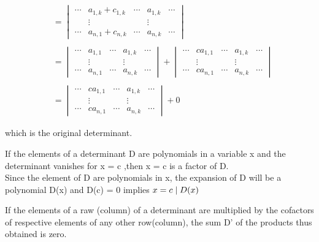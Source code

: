 \documentclass{article}
\begin{document}
\begin{align*}
 &=\begin{vmatrix}
\cdots&a_{1,k}+c_{1,k}&\cdots&a_{1,k}& \cdots      \\
&\vdots & &\vdots \\ 
\cdots&a_{n,1}+c_{n,k}  & \cdots & a_{n,k} & \cdots
\end{vmatrix} \\ \\
&= \begin{vmatrix}
\cdots&a_{1,1}      &\cdots& a_{1,k}& \cdots      \\
&\vdots & &\vdots \\ 
\cdots&a_{n,1}  & \cdots & a_{n,k} & \cdots
\end{vmatrix}
+ \begin{vmatrix}
\cdots&ca_{1,1}      & \cdots & a_{1,k}  & \cdots      \\
&\vdots & &\vdots \\ 
\cdots&ca_{n,1}  & \cdots & a_{n,k} & \cdots
\end{vmatrix} \\ \\
&= \begin{vmatrix}
\cdots&ca_{1,1}      & \cdots & a_{1,k}  & \cdots      \\
&\vdots & &\vdots \\ 
\cdots&ca_{n,1}  & \cdots & a_{n,k} & \cdots
\end{vmatrix} +0
\end{align*}



which is the original determinant.\\ 


\begin{thm}[]	
If the elements of a determinant D are polynomials in a variable x and the determinant vanishes for x = c ,then x = c is a factor of  D.\\

Since the element of D are polynomials in x, the expansion of D will be a polynomial D(x) and D(c) = 0 implies 
$ x = c \mid D(x) \\
$
\end{thm}
\begin{thm}[] If the elements of a raw (column) of a determinant are multiplied by the cofactors of respective elements of any other row(column), the sum D' of the products thus obtained is zero.	
\end{thm}	
$
$
\end{document}
